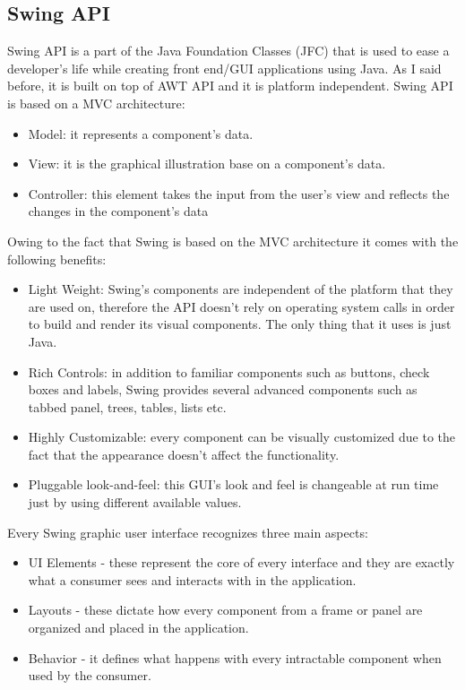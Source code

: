 \documentclass[12pt,a4paper]{report}
\begin{document}
\subsection{Swing API}
Swing API is a part of the Java Foundation Classes (JFC) that is used to ease a developer's life while creating front end/GUI applications using Java. As I said before, it is built on top of AWT API and it is platform independent. Swing API is based on a MVC architecture:
 \begin{itemize}
 	\item Model: it represents a component's data.  
 	\item View: it is the graphical illustration base on a component's data.
 	\item Controller: this element takes the input from the user's view and reflects the changes in the component's data
 \end{itemize}
Owing to the fact that Swing is based on the MVC architecture it comes with the following benefits:
\begin{itemize}
	\item Light Weight: Swing's components are independent of the platform that they are used on, therefore the API doesn't rely on operating system calls in order to build and render its visual components. The only thing that it uses is just Java. 
	\item Rich Controls: in addition to familiar components such as buttons, check boxes and labels, Swing provides several advanced components such as tabbed panel, trees, tables, lists etc.
	\item Highly Customizable: every component can be visually customized due to the fact that the appearance doesn't affect the functionality.
	\item Pluggable look-and-feel: this GUI's look and feel is changeable at run time just by using different available values.    
\end{itemize}
Every Swing graphic user interface recognizes three main aspects:
\begin{itemize}
	\item UI Elements - these represent the core of every interface and they are exactly what a consumer sees and interacts with in the application. 
	\item Layouts - these dictate how every component from a frame or panel are organized and placed in the application.
	\item Behavior - it defines what happens with every intractable component when used by the consumer.
\end{itemize}
\end{document}
